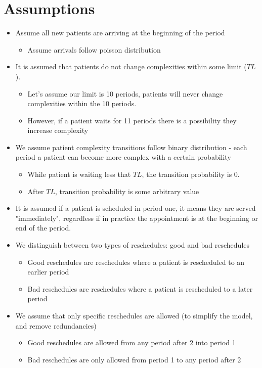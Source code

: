 \documentclass{article}
\begin{document}
\section{Assumptions} 
\begin{itemize}
	\item Assume all new patients are arriving at the beginning of the period 
	\begin{itemize}
		\item Assume arrivals follow poisson distribution
	\end{itemize}		
	
	\item It is assumed that patients do not change complexities within some limit ($TL$). 
	\begin{itemize}
		\item Let's assume our limit is 10 periods, patients will never change complexities within the 10 periods.  
		\item However, if a patient waits for 11 periods there is a possibility they increase complexity
	\end{itemize}		
	
	\item We assume patient complexity transitions follow binary distribution - each period a patient can become more complex with a certain probability
	\begin{itemize}
		\item While patient is waiting less that $TL$, the transition probability is 0.
		\item After $TL$, transition probability is some arbitrary value
	\end{itemize}
	
	\item It is assumed if a patient is scheduled in period one, it means they are served "immediately", regardless if in practice the appointment is at the beginning or end of the period.
	\item We distinguish between two types of reschedules: good and bad reschedules
	\begin{itemize}
		\item Good reschedules are reschedules where a patient is rescheduled to an earlier period
		\item Bad reschedules are reschedules where a patient is rescheduled to a later period
	\end{itemize}

	\item We assume that only specific reschedules are allowed (to simplify the model, and remove  redundancies)
	\begin{itemize}
		\item Good reschedules are allowed from any period after 2 into period 1
		\item Bad reschedules are only allowed from period 1 to any period after 2
	\end{itemize}
	

\end{itemize}
\end{document}
